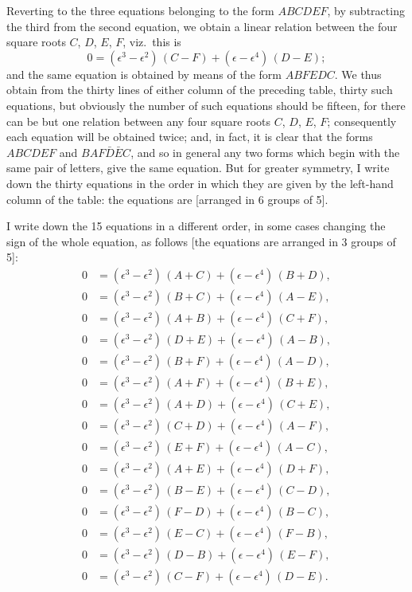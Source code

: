 \documentclass[11pt,a4paper]{book}
\begin{document}
Reverting to the three equations belonging to the form $ABCDEF$, by subtracting
the third from the second equation, we obtain a linear relation between the four
square roots $C$, $D$, $E$, $F$, viz.\ this is
\[
0 = (\epsilon^3 - \epsilon^2)\, (C - F) + (\epsilon - \epsilon^4)\, (D - E);
\]
and the same equation is obtained by means of the form $ABFEDC$. We thus obtain
from the thirty lines of either column of the preceding table, thirty such equations,
but obviously the number of such equations should be fifteen, for there can be but
one relation between any four square roots $C$, $D$, $E$, $F$; consequently each equation
will be obtained twice; and, in fact, it is clear that the forms $ABCDEF$ and
$BAF\bar{D}\bar{E}C$, and so in general any two forms which begin with the same pair of
letters, give the same equation. But for greater symmetry, I write down the thirty
equations in the order in which they are given by the left-hand column of the
table: the equations are [arranged in 6 groups of 5].

I write down the 15 equations in a different order, in some cases changing the
sign of the whole equation, as follows [the equations are arranged in 3 groups of 5]:
\begin{align*}
0 &= (\epsilon^3 - \epsilon^2)\, (A + C) + (\epsilon - \epsilon^4)\, (B + D),\\
0 &= (\epsilon^3 - \epsilon^2)\, (B + C) + (\epsilon - \epsilon^4)\, (A - E),\\
0 &= (\epsilon^3 - \epsilon^2)\, (A + B) + (\epsilon - \epsilon^4)\, (C + F),\\
0 &= (\epsilon^3 - \epsilon^2)\, (D + E) + (\epsilon - \epsilon^4)\, (A - B),\\
0 &= (\epsilon^3 - \epsilon^2)\, (B + F) + (\epsilon - \epsilon^4)\, (A - D),\\
0 &= (\epsilon^3 - \epsilon^2)\, (A + F) + (\epsilon - \epsilon^4)\, (B + E),\\
0 &= (\epsilon^3 - \epsilon^2)\, (A + D) + (\epsilon - \epsilon^4)\, (C + E),\\
0 &= (\epsilon^3 - \epsilon^2)\, (C + D) + (\epsilon - \epsilon^4)\, (A - F),\\
0 &= (\epsilon^3 - \epsilon^2)\, (E + F) + (\epsilon - \epsilon^4)\, (A - C),\\
0 &= (\epsilon^3 - \epsilon^2)\, (A + E) + (\epsilon - \epsilon^4)\, (D + F),\\
0 &= (\epsilon^3 - \epsilon^2)\, (B - E) + (\epsilon - \epsilon^4)\, (C - D),\\
0 &= (\epsilon^3 - \epsilon^2)\, (F - D) + (\epsilon - \epsilon^4)\, (B - C),\\
0 &= (\epsilon^3 - \epsilon^2)\, (E - C) + (\epsilon - \epsilon^4)\, (F - B),\\
0 &= (\epsilon^3 - \epsilon^2)\, (D - B) + (\epsilon - \epsilon^4)\, (E - F),\\
0 &= (\epsilon^3 - \epsilon^2)\, (C - F) + (\epsilon - \epsilon^4)\, (D - E).
\end{align*}
\end{document}
